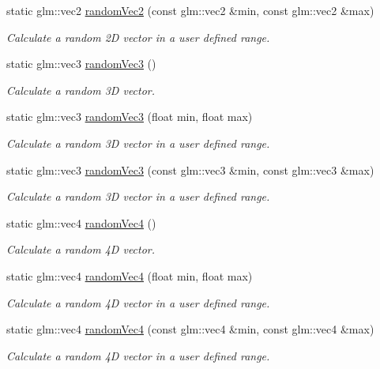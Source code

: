 \begin{DoxyCompactItemize}
static glm\+::vec2 \mbox{\hyperlink{classr3_1_1_random_a8c7e00a7b7e0fa8ce5c506e235bd6ed0}{random\+Vec2}} (const glm\+::vec2 \&min, const glm\+::vec2 \&max)
\begin{DoxyCompactList}\small\item\em Calculate a random 2D vector in a user defined range. \end{DoxyCompactList}\item 
static glm\+::vec3 \mbox{\hyperlink{classr3_1_1_random_a1819bc51a8924a8cbc4f8b2fc99d9a95}{random\+Vec3}} ()
\begin{DoxyCompactList}\small\item\em Calculate a random 3D vector. \end{DoxyCompactList}\item 
static glm\+::vec3 \mbox{\hyperlink{classr3_1_1_random_a85e5f280dcc4c84eea61bebb60b47d4a}{random\+Vec3}} (float min, float max)
\begin{DoxyCompactList}\small\item\em Calculate a random 3D vector in a user defined range. \end{DoxyCompactList}\item 
static glm\+::vec3 \mbox{\hyperlink{classr3_1_1_random_a1011998debe4842957f855c11ed1e1c2}{random\+Vec3}} (const glm\+::vec3 \&min, const glm\+::vec3 \&max)
\begin{DoxyCompactList}\small\item\em Calculate a random 3D vector in a user defined range. \end{DoxyCompactList}\item 
static glm\+::vec4 \mbox{\hyperlink{classr3_1_1_random_a567db457c9f995ca1062677d905f61d0}{random\+Vec4}} ()
\begin{DoxyCompactList}\small\item\em Calculate a random 4D vector. \end{DoxyCompactList}\item 
static glm\+::vec4 \mbox{\hyperlink{classr3_1_1_random_aec123971a394e6b064d00e7abb61d2a1}{random\+Vec4}} (float min, float max)
\begin{DoxyCompactList}\small\item\em Calculate a random 4D vector in a user defined range. \end{DoxyCompactList}\item 
static glm\+::vec4 \mbox{\hyperlink{classr3_1_1_random_a69cce589274029051cc7568dd8fde54d}{random\+Vec4}} (const glm\+::vec4 \&min, const glm\+::vec4 \&max)
\begin{DoxyCompactList}\small\item\em Calculate a random 4D vector in a user defined range. \end{DoxyCompactList}\item 

\end{DoxyCompactItemize}

